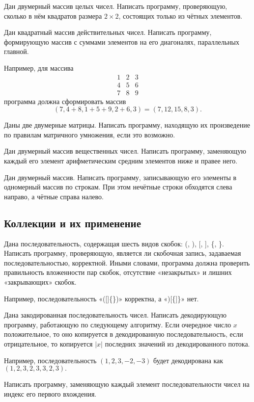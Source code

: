 \task Дан двумерный массив целых чисел. Написать программу,
проверяющую, сколько в нём квадратов размера $2\times 2$, состоящих
только из чётных элементов.

\task Дан квадратный массив действительных чисел. Написать программу,
формирующую массив с суммами элементов на его диагоналях, параллельных
главной.

Например, для массива
\[
\begin{array}{ccc}
  1 & 2 & 3 \\
  4 & 5 & 6 \\
  7 & 8 & 9
\end{array}
\]
программа должна сформировать массив
\[
(7, 4+8, 1+5+9, 2+6, 3) = (7, 12, 15, 8, 3).
\]

\task Даны две двумерные матрицы. Написать программу, находящую их
произведение по правилам матричного умножения, если это возможно.

\task Дан двумерный массив вещественных чисел. Написать программу,
заменяющую каждый его элемент арифметическим средним элементов ниже и
правее него.

\task Дан двумерный массив. Написать программу, записывающую его
элементы в одномерный массив по строкам. При этом нечётные строки
обходятся слева направо, а чётные справа налево.

\subsection{Коллекции и их применение}

\task Дана последовательность, содержащая шесть видов скобок: (, ), [,
], \{, \}. Написать программу, проверяющую, является ли скобочная
запись, задаваемая последовательностью,
корректной. Иными словами, программа должна проверить правильность
вложенности пар скобок, отсутствие «незакрытых» и лишних «закрывающих»
скобок.

Например, последовательность «([]\{\})» корректна, а «)[\{]\}» нет.

\task Дана закодированная последовательность чисел. Написать
декодирующую программу, работающую по следующему алгоритму. Если
очередное число $x$ положительное, то оно копируется в декодированную
последовательность, если отрицательное, то копируется $|x|$ последних
значений из декодированного потока.

Например, последовательность $(1, 2, 3, -2, -3)$ будет декодирована как
$(1, 2, 3, 2, 3, 3, 2, 3).$

\task Написать программу, заменяющую каждый элемент последовательности
чисел на индекс его первого вхождения.

